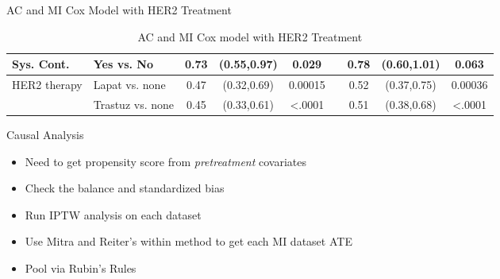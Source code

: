 \begin{frame}{AC and MI Cox Model with HER2 Treatment}
\begin{table}[]
{\begin{tabular}{|l|l|c|c|c|c|c|c|c|}
Sys. Cont.                     & Yes vs. No                       & 0.73                  & (0.55,0.97)                                        & 0.029                 &                       & 0.78 & (0.60,1.01)                                                          & 0.063                                                       \\ \hline
HER2 therapy                   & Lapat vs. none                   & 0.47                  & (0.32,0.69)                                        & 0.00015               &                       & 0.52 & (0.37,0.75)                                                          & 0.00036                                                     \\ \hline
                               & Trastuz vs. none                 & 0.45                  & (0.33,0.61)                                        & \textless.0001        &                       & 0.51 & (0.38,0.68)                                                          & \textless.0001                                              \\ \hline
\end{tabular}
}
\caption{AC and MI Cox model with HER2 Treatment}

\end{table}
\end{frame}

\begin{frame}{Causal Analysis}
\begin{itemize}
 \item Need to get propensity score from \textit{pretreatment} covariates
 \item Check the balance and standardized bias
 \item Run IPTW analysis on each dataset
 \item Use Mitra and Reiter's within method to get each MI dataset ATE \cite{Mitra2012}
 \item Pool via Rubin's Rules
\end{itemize}
\end{frame}

 


